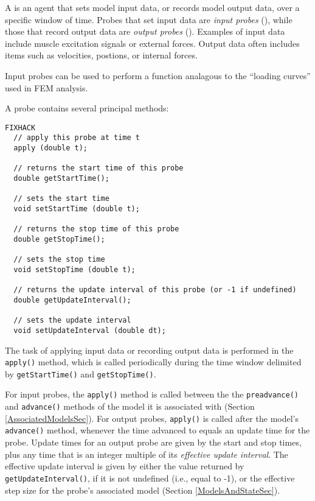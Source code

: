 \documentclass{article}
\begin{document}

A  is an agent that sets model input data, or records
model output data, over a specific window of time. Probes that set
input data are {\it input probes} (), while those that
record output data are {\it output probes} (). Examples
of input data include muscle excitation signals or external
forces. Output data often includes items such as velocities, postions,
or internal forces.

Input probes can be used to perform a function analagous to
the ``loading curves'' used in FEM analysis.

A probe contains several principal methods:
\begin{lstlisting}FIXHACK
  // apply this probe at time t
  apply (double t);

  // returns the start time of this probe
  double getStartTime();

  // sets the start time
  void setStartTime (double t);

  // returns the stop time of this probe
  double getStopTime();

  // sets the stop time
  void setStopTime (double t);

  // returns the update interval of this probe (or -1 if undefined) 
  double getUpdateInterval();

  // sets the update interval
  void setUpdateInterval (double dt);
\end{lstlisting}

The task of applying input data or recording output data is performed
in the {\tt apply()} method, which is called periodically during the time
window delimited by {\tt getStartTime()} and {\tt getStopTime()}. 

For input probes, the {\tt apply()} method is called between the the
{\tt preadvance()} and {\tt advance()} methods of the model it is
associated with (Section \ref{AssociatedModelsSec}).  For output
probes, {\tt apply()} is called after the model's {\tt advance()} method,
whenever the time advanced to equals an update time for the
probe. Update times for an output probe are given by the start and
stop times, plus any time that is an integer multiple of its {\it
effective update interval}. The effective update interval is given by
either the value returned by {\tt getUpdateInterval()}, if it is not
undefined (i.e., equal to -1), or the effective step size for the
probe's associated model (Section \ref{ModelsAndStateSec}).
\end{document}
